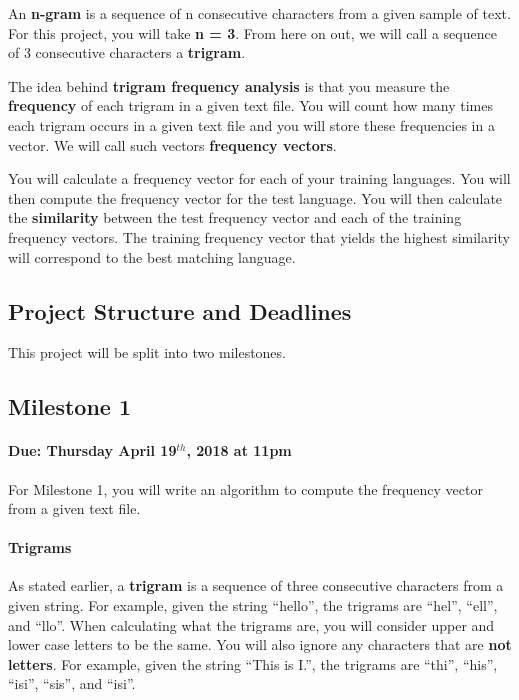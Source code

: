 \documentclass[]{article}
\let\oldparagraph\paragraph
\renewcommand{\paragraph}[1]{\oldparagraph{#1}\mbox{}}
\begin{document}
An \textbf{n-gram} is a sequence of n consecutive characters from a
given sample of text. For this project, you will take \textbf{n = 3}.
From here on out, we will call a sequence of 3 consecutive characters a
\textbf{trigram}.

The idea behind \textbf{trigram frequency analysis} is that you measure
the \textbf{frequency} of each trigram in a given text file. You will
count how many times each trigram occurs in a given text file and you
will store these frequencies in a vector. We will call such vectors
\textbf{frequency vectors}.

You will calculate a frequency vector for each of your training
languages. You will then compute the frequency vector for the test
language. You will then calculate the \textbf{similarity} between the
test frequency vector and each of the training frequency vectors. The
training frequency vector that yields the highest similarity will
correspond to the best matching language.

\subsection{Project Structure and
Deadlines}\label{project-structure-and-deadlines}

This project will be split into two milestones.

\subsection{Milestone 1}\label{milestone-1}

\paragraph{\texorpdfstring{Due: Thursday April 19$^{th}$, 2018 at
11pm}{Due: Thursday April 19$^{th}$, 2018 at 11pm}}\label{due-thursday-april-19th-2018-at-11pm}

For Milestone 1, you will write an algorithm to compute the frequency
vector from a given text file.

\paragraph{Trigrams}\label{trigrams}

As stated earlier, a \textbf{trigram} is a sequence of three consecutive
characters from a given string. For example, given the string ``hello'',
the trigrams are ``hel'', ``ell'', and ``llo''. When calculating what
the trigrams are, you will consider upper and lower case letters to be
the same. You will also ignore any characters that are \textbf{not
letters}. For example, given the string ``This is I.'', the trigrams are
``thi'', ``his'', ``isi'', ``sis'', and ``isi''.
\end{document}
